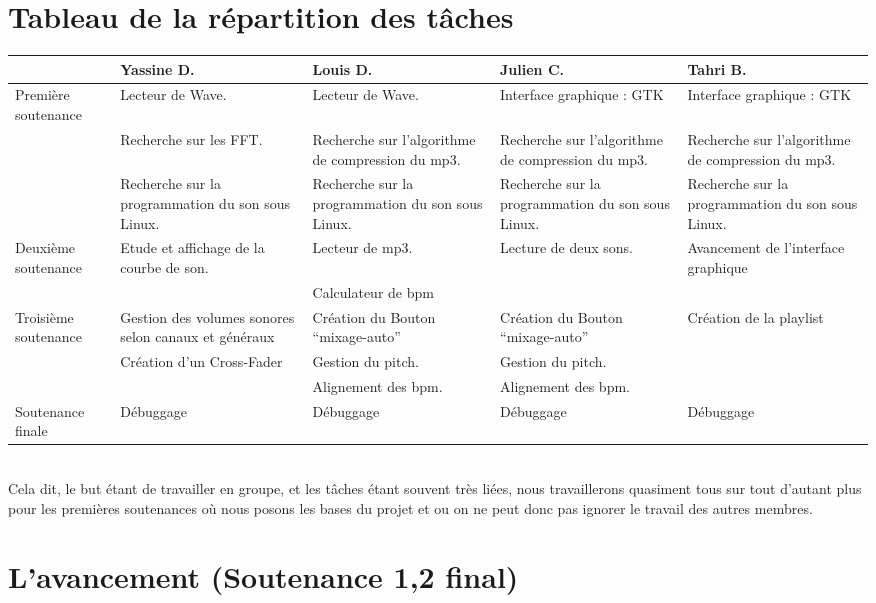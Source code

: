 \documentclass[12pt]{report}
\begin{document}
    \section{Tableau de la répartition des tâches}
    \begin{center}
        \begin{tabular}{|p{2 cm}||p{2.5cm}|p{2.5cm}|p{2.5cm}|p{2.5cm}|}
\hline
 & Yassine D. & Louis D. & Julien C. & Tahri B.
\\
\hline \hline Première soutenance
 & Lecteur de Wave.
 & Lecteur de Wave.
 & Interface graphique : GTK
 & Interface graphique : GTK
\\
 & Recherche sur les FFT.
 & Recherche sur l'algorithme de compression du mp3.
 & Recherche sur l'algorithme de compression du mp3.
 & Recherche sur l'algorithme de compression du mp3.
\\
 & Recherche sur la programmation du son sous Linux.
 & Recherche sur la programmation du son sous Linux.
 & Recherche sur la programmation du son sous Linux.
 & Recherche sur la programmation du son sous Linux.
\\
\hline Deuxième soutenance
 & Etude et affichage de la courbe de son.
 & Lecteur de mp3.
 & Lecture de deux sons.
 & Avancement de l'interface graphique
\\
 &
 & Calculateur de bpm
 &
 &
\\
\hline Troisième soutenance
 & Gestion des volumes sonores selon canaux et généraux
 & Création du Bouton ``mixage-auto''
 & Création du Bouton ``mixage-auto''
 & Création de la playlist
\\
 & Création d'un Cross-Fader
 & Gestion du pitch.
 & Gestion du pitch.
 &
\\
 &
 & Alignement des bpm.
 & Alignement des bpm.
 &
\\
\hline Soutenance finale
 & Débuggage
 & Débuggage
 & Débuggage
 & Débuggage
\\
\hline
\end{tabular}
    \end{center}
    \\
    Cela dit, le but étant de travailler en groupe, et les tâches
    étant souvent très liées, nous travaillerons quasiment tous sur
    tout d'autant plus pour les premières soutenances où nous posons
    les bases du projet et ou on ne peut donc pas ignorer le travail
    des autres membres.
    \section{L'avancement (Soutenance 1,2 final)} 
\end{document}
